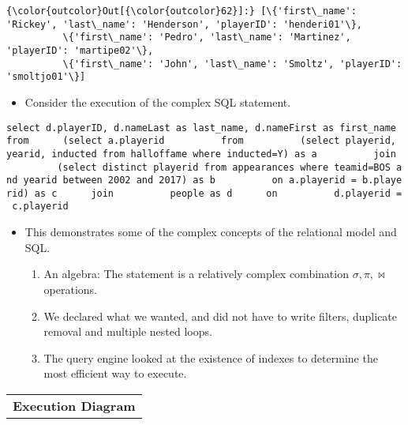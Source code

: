 \documentclass[11pt]{article}
\providecommand{\tightlist}{%
      \setlength{\itemsep}{0pt}\setlength{\parskip}{0pt}}
\begin{document}
\begin{Verbatim}[commandchars=\\\{\}]
{\color{outcolor}Out[{\color{outcolor}62}]:} [\{'first\_name': 'Rickey', 'last\_name': 'Henderson', 'playerID': 'henderi01'\},
          \{'first\_name': 'Pedro', 'last\_name': 'Martinez', 'playerID': 'martipe02'\},
          \{'first\_name': 'John', 'last\_name': 'Smoltz', 'playerID': 'smoltjo01'\}]
\end{Verbatim}
            
    \begin{itemize}
\tightlist
\item
  Consider the execution of the complex SQL statement.
\end{itemize}

\texttt{select\ d.playerID,\ d.nameLast\ as\ last\_name,\ d.nameFirst\ as\ first\_name\ from\ \ \ \ \ \ (select\ a.playerid\ \ \ \ \ \ \ \ \ \ from\ \ \ \ \ \ \ \ \ \ (select\ playerid,\ yearid,\ inducted\ from\ halloffame\ where\ inducted=\textquotesingle{}Y\textquotesingle{})\ as\ a\ \ \ \ \ \ \ \ \ \ join\ \ \ \ \ \ \ \ \ \ (select\ distinct\ playerid\ from\ appearances\ where\ teamid=\textquotesingle{}BOS\textquotesingle{}\ and\ yearid\ between\ \textquotesingle{}2002\textquotesingle{}\ and\ \textquotesingle{}2017\textquotesingle{})\ as\ b\ \ \ \ \ \ \ \ \ \ on\ a.playerid\ =\ b.playerid)\ as\ c\ \ \ \ \ \ join\ \ \ \ \ \ \ \ \ \ people\ as\ d\ \ \ \ \ \ on\ \ \ \ \ \ \ \ \ \ d.playerid\ =\ c.playerid}

\begin{itemize}
\tightlist
\item
  This demonstrates some of the complex concepts of the relational model
  and SQL.

  \begin{enumerate}
  \def\labelenumi{\arabic{enumi}.}
  \tightlist
  \item
    An algebra: The statement is a relatively complex combination
    \(\sigma, \pi, \bowtie\) operations.
  \item
    We declared what we wanted, and did not have to write filters,
    duplicate removal and multiple nested loops.
  \item
    The query engine looked at the existence of indexes to determine the
    most efficient way to execute.
  \end{enumerate}
\end{itemize}

    \begin{longtable}[]{@{}c@{}}
\toprule
\tabularnewline
\midrule
\endhead
\textbf{Execution Diagram}\tabularnewline
\bottomrule
\end{longtable}
\end{document}

